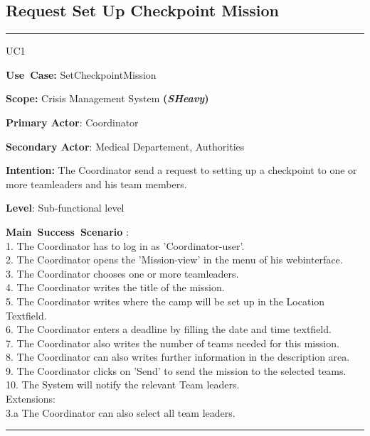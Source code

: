 \subsection{Request Set Up Checkpoint Mission}
\vspace{0.5cm}
\hrule
\vspace{0.5cm}
\begin{lyxlist}{UC1}
\small{
\item [\textbf{Use~Case:}] SetCheckpointMission
\item [\textbf{Scope:}] Crisis Management System \textbf{(\emph{SHeavy})}
\item [\textbf{Primary Actor}:] Coordinator
\item [\textbf{Secondary Actor}:] Medical Departement, Authorities
\item [\textbf{Intention:}]The Coordinator send a request to setting up a
checkpoint to one or more teamleaders and his team members.
\item [\textbf{Level}:]Sub-functional level
\item [\textbf{Main~Success~Scenario}]:\\
1. The Coordinator has to log in as 'Coordinator-user'.\\
2. The Coordinator opens the 'Mission-view' in the menu of his webinterface.\\
3. The Coordinator chooses one or more teamleaders.\\
4. The Coordinator writes the title of the mission.\\
5. The Coordinator writes where the camp will be set up in the Location
Textfield.\\
6. The Coordinator enters a deadline by filling the date and time textfield.\\
7. The Coordinator also writes the number of teams needed for this mission.\\
8. The Coordinator can also writes further information in the description
area.\\
9. The Coordinator clicks on 'Send' to send the mission to the selected
teams.\\
10. The System will notify the relevant Team leaders.\\
Extensions:\\
	3.a The Coordinator can also select all team leaders.\\
}
\end{lyxlist}
\hrule 
\vspace{0.5cm} 


